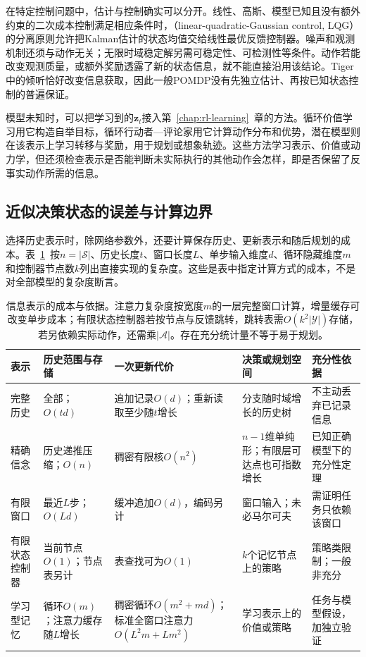 在特定控制问题中，估计与控制确实可以分开。线性、高斯、模型已知且没有额外约束的二次成本控制满足相应条件时，（linear-quadratic-Gaussian control, LQG）的分离原则允许把Kalman估计的状态均值交给线性最优反馈控制器。噪声和观测机制还须与动作无关；无限时域稳定解另需可稳定性、可检测性等条件。动作若能改变观测质量，或额外奖励透露了新的状态信息，就不能直接沿用该结论。Tiger中的倾听恰好改变信息获取，因此一般POMDP没有先独立估计、再按已知状态控制的普遍保证。

模型未知时，可以把学习到的$\bm z_t$接入第~\ref{chap:rl-learning}~章的方法。循环价值学习用它构造自举目标，循环行动者—评论家用它计算动作分布和优势，潜在模型则在该表示上学习转移与奖励，用于规划或想象轨迹。这些方法学习表示、价值或动力学，但还须检查表示是否能判断未实际执行的其他动作会怎样，即是否保留了反事实动作所需的信息。

\subsection{近似决策状态的误差与计算边界}
\label{sec:rl-information-memory-errors}

选择历史表示时，除网络参数外，还要计算保存历史、更新表示和随后规划的成本。表~\ref{tab:rl-information-memory-cost}~按$n=|\mathcal S|$、历史长度$t$、窗口长度$L$、单步输入维度$d$、循环隐藏维度$m$和控制器节点数$k$列出直接实现的复杂度。这些是表中指定计算方式的成本，不是对全部模型的复杂度断言。

\begin{table}[htbp]
  \centering
  \small
  \begin{tabularx}{\linewidth}{p{21mm}XXXX}
    \toprule
    表示 & 历史范围与存储 & 一次更新代价 & 决策或规划空间 & 充分性依据 \\
    \midrule
    完整历史 & 全部；$O(td)$ & 追加记录$O(d)$；重新读取至少随$t$增长 & 分支随时域增长的历史树 & 不主动丢弃已记录信息 \\
    精确信念 & 历史递推压缩；$O(n)$ & 稠密有限核$O(n^2)$ & $n-1$维单纯形；有限层可达点也可指数增长 & 已知正确模型下的充分性定理 \\
    有限窗口 & 最近$L$步；$O(Ld)$ & 缓冲追加$O(d)$，编码另计 & 窗口输入；未必马尔可夫 & 需证明任务只依赖该窗口 \\
    有限状态控制器 & 当前节点$O(1)$；节点表另计 & 表查找可为$O(1)$ & $k$个记忆节点上的策略 & 策略类限制；一般非充分 \\
    学习型记忆 & 循环$O(m)$；注意力缓存随$L$增长 & 稠密循环$O(m^2+md)$；标准全窗口注意力$O(L^2m+Lm^2)$ & 学习表示上的价值或策略 & 任务与模型假设，加独立验证 \\
    \bottomrule
  \end{tabularx}
  \caption{信息表示的成本与依据。注意力复杂度按宽度$m$的一层完整窗口计算，增量缓存可改变单步成本；有限状态控制器若按节点与反馈跳转，跳转表需$O(k^2|\mathcal Y|)$存储，若另依赖实际动作，还需乘$|\mathcal A|$。存在充分统计量不等于易于规划。}
  \label{tab:rl-information-memory-cost}
\end{table}

